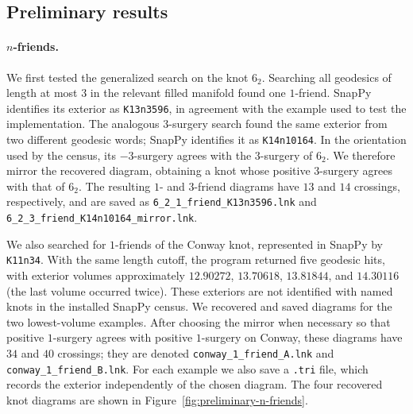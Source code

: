 \subsection{Preliminary results}

\paragraph{$n$-friends.}
We first tested the generalized search on the knot $6_2$.  Searching all
geodesics of length at most $3$ in the relevant filled manifold found one
$1$-friend.  SnapPy identifies its exterior as \texttt{K13n3596}, in
agreement with the example used to test the implementation.  The analogous
$3$-surgery search found the same exterior from two different geodesic words;
SnapPy identifies it as \texttt{K14n10164}.  In the orientation used by the
census, its $-3$-surgery agrees with the $3$-surgery of $6_2$.  We therefore
mirror the recovered diagram, obtaining a knot whose positive $3$-surgery
agrees with that of $6_2$.  The resulting $1$- and $3$-friend diagrams have
$13$ and $14$ crossings, respectively, and are saved as
\texttt{6\_2\_1\_friend\_K13n3596.lnk} and
\texttt{6\_2\_3\_friend\_K14n10164\_mirror.lnk}.

We also searched for $1$-friends of the Conway knot, represented in SnapPy by
\texttt{K11n34}.  With the same length cutoff, the program returned five
geodesic hits, with exterior volumes approximately $12.90272$, $13.70618$,
$13.81844$, and $14.30116$ (the last volume occurred twice).  These exteriors
are not identified with named knots in the installed SnapPy census.  We
recovered and saved diagrams for the two lowest-volume examples.  After
choosing the mirror when necessary so that positive $1$-surgery agrees with
positive $1$-surgery on Conway, these diagrams have $34$ and $40$ crossings;
they are denoted \texttt{conway\_1\_friend\_A.lnk} and
\texttt{conway\_1\_friend\_B.lnk}.  For each example we also save a
\texttt{.tri} file, which records the exterior independently of the chosen
diagram.  The four recovered knot diagrams are shown in
Figure~\ref{fig:preliminary-n-friends}.

